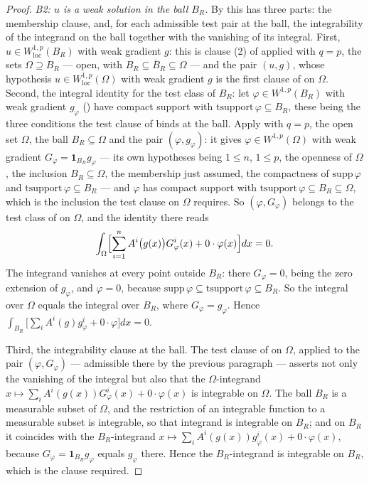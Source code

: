 \begin{proof}
\emph{B2: $u$ is a weak solution in the ball $B_R$.}  By
 this has three parts: the membership clause, and,
for each admissible test pair at the ball, the integrability of the integrand on
the ball together with the vanishing of its integral.  First,
$u\in W^{1,p}_{\mathrm{loc}}(B_R)$ with weak gradient $g$: this is clause (2) of
 applied with $q=p$, the sets
$\Omega\supseteq B_R$ --- open, with $B_R\subseteq\overline B_R\subseteq\Omega$
--- and the pair $(u,g)$, whose hypothesis
$u\in W^{1,p}_{\mathrm{loc}}(\Omega)$ with weak gradient $g$ is the first clause
of  on $\Omega$.  Second, the integral identity for
the test class of $B_R$: let $\varphi\in W^{1,p}(B_R)$ with weak gradient
$g_\varphi$ () have compact support with
$\mathrm{tsupport}\,\varphi\subseteq B_R$, these being the three conditions the
test clause of  binds at the ball.  Apply
 with $q=p$, the open set $\Omega$, the ball
$B_R\subseteq\Omega$ and the pair $(\varphi,g_\varphi)$: it gives
$\varphi\in W^{1,p}(\Omega)$ with weak gradient
$G_\varphi=\mathbf1_{B_R}g_\varphi$ --- its own hypotheses being $1\le n$,
$1\le p$, the openness of $\Omega$, the inclusion $B_R\subseteq\Omega$, the
membership just assumed, the compactness of $\mathrm{supp}\,\varphi$ and
$\mathrm{tsupport}\,\varphi\subseteq B_R$ --- and $\varphi$ has compact support
with $\mathrm{tsupport}\,\varphi\subseteq B_R\subseteq\Omega$, which is the
inclusion the test clause on $\Omega$ requires.  So
$(\varphi,G_\varphi)$ belongs to the test class of  on
$\Omega$, and the identity there reads
\[
\int_\Omega\Bigl[\sum_{i=1}^nA^i\bigl(g(x)\bigr)G_\varphi^i(x)+0\cdot\varphi(x)\Bigr]dx=0 .
\]
The integrand vanishes at every point outside $B_R$: there $G_\varphi=0$,
being the zero extension of $g_\varphi$, and $\varphi=0$, because
$\mathrm{supp}\,\varphi\subseteq\mathrm{tsupport}\,\varphi\subseteq B_R$.  So the
integral over $\Omega$ equals the integral over $B_R$, where
$G_\varphi=g_\varphi$.  Hence
$\int_{B_R}\bigl[\sum_iA^i(g)g_\varphi^i+0\cdot\varphi\bigr]dx=0$.

Third, the integrability clause at the ball.  The test clause of
 on $\Omega$, applied to the pair
$(\varphi,G_\varphi)$ --- admissible there by the previous paragraph --- asserts
not only the vanishing of the integral but also that the $\Omega$-integrand
$x\mapsto\sum_iA^i(g(x))G_\varphi^i(x)+0\cdot\varphi(x)$ is integrable on
$\Omega$.  The ball $B_R$ is a measurable subset of $\Omega$, and the
restriction of an integrable function to a measurable subset is integrable, so
that integrand is integrable on $B_R$; and on $B_R$ it coincides with the
$B_R$-integrand $x\mapsto\sum_iA^i(g(x))g_\varphi^i(x)+0\cdot\varphi(x)$,
because $G_\varphi=\mathbf1_{B_R}g_\varphi$ equals $g_\varphi$ there.  Hence the
$B_R$-integrand is integrable on $B_R$, which is the clause required.


\end{proof}
